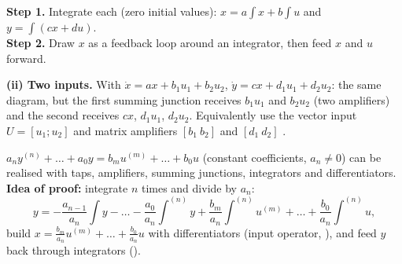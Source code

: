 \begin{workbox}[title={Worked example (AE1, A1.2): coupled equations $\dot x=ax+bu,\ \dot y=cx+du$}]
\textbf{Step 1.} Integrate each (zero initial values): $x=a\int x+b\int u$ and $y=\int(cx+du)$.\\
\textbf{Step 2.} Draw $x$ as a feedback loop around an integrator, then feed $x$ and $u$ forward.
\begin{center}
\end{center}
\textbf{(ii) Two inputs.} With $\dot x=ax+b_1u_1+b_2u_2$, $\dot y=cx+d_1u_1+d_2u_2$: the same diagram, but the first summing junction
receives $b_1u_1$ and $b_2u_2$ (two amplifiers) and the second receives $cx$, $d_1u_1$, $d_2u_2$. Equivalently use the vector input $U=[u_1;u_2]$
and matrix amplifiers $[b_1\ b_2]$ and $[d_1\ d_2]$ .
\end{workbox}

\begin{thmbox}[title={Proposition 0.1 \fr{20}: ODEs are feedback systems}]
$a_ny^{(n)}+\dots+a_0y=b_mu^{(m)}+\dots+b_0u$ (constant coefficients, $a_n\neq0$) can be realised with taps, amplifiers, summing junctions,
integrators and differentiators. \textbf{Idea of proof:} integrate $n$ times and divide by $a_n$:
\[ y=-\frac{a_{n-1}}{a_n}\int y-\dots-\frac{a_0}{a_n}\int^{(n)}y+\frac{b_m}{a_n}\int^{(n)}u^{(m)}+\dots+\frac{b_0}{a_n}\int^{(n)}u ,\]
build $x=\frac{b_m}{a_n}u^{(m)}+\dots+\frac{b_0}{a_n}u$ with differentiators (input operator, ), and feed $y$ back through integrators ().
\end{thmbox}

